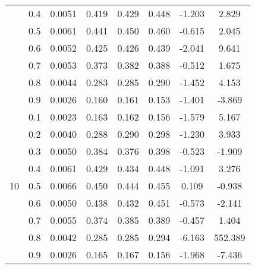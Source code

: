 \documentclass[11pt,a4paper]{report}
\begin{document}
\begin{longtable}{ | c | c || c | c | c | c | c | c | }
 & 0.4 & 0.0051 & 0.419 & 0.429 & 0.448 & -1.203 & 2.829 \\
 & 0.5 & 0.0061 & 0.441 & 0.450 & 0.460 & -0.615 & 2.045 \\
 & 0.6 & 0.0052 & 0.425 & 0.426 & 0.439 & -2.041 & 9.641 \\
 & 0.7 & 0.0053 & 0.373 & 0.382 & 0.388 & -0.512 & 1.675 \\
 & 0.8 & 0.0044 & 0.283 & 0.285 & 0.290 & -1.452 & 4.153 \\
 & 0.9 & 0.0026 & 0.160 & 0.161 & 0.153 & -1.401 & -3.869 \\
 \hline
\multirow{9}{*}{10} & 0.1 & 0.0023 & 0.163 & 0.162 & 0.156 & -1.579 & 5.167 \\
 & 0.2 & 0.0040 & 0.288 & 0.290 & 0.298 & -1.230 & 3.933 \\
 & 0.3 & 0.0050 & 0.384 & 0.376 & 0.398 & -0.523 & -1.909 \\
 & 0.4 & 0.0061 & 0.429 & 0.434 & 0.448 & -1.091 & 3.276 \\
 & 0.5 & 0.0066 & 0.450 & 0.444 & 0.455 & 0.109 & -0.938 \\
 & 0.6 & 0.0050 & 0.438 & 0.432 & 0.451 & -0.573 & -2.141 \\
 & 0.7 & 0.0055 & 0.374 & 0.385 & 0.389 & -0.457 & 1.404 \\
 & 0.8 & 0.0042 & 0.285 & 0.285 & 0.294 & -6.163 & 552.389 \\
 & 0.9 & 0.0026 & 0.165 & 0.167 & 0.156 & -1.968 & -7.436 \\
 \hline
\hline
\end{longtable}
\end{document}
